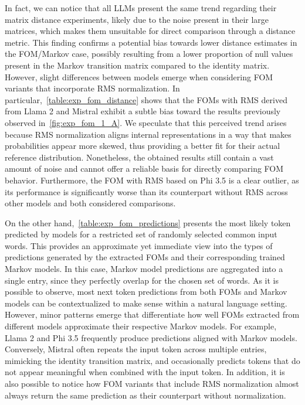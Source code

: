 In fact, we can notice that all LLMs present the same trend regarding their matrix distance experiments, likely due to the noise present in their large matrices, which makes them unsuitable for direct comparison through a distance metric.
This finding confirms a potential bias towards lower distance estimates in the FOM/Markov case, possibly resulting from a lower proportion of null values present in the Markov transition matrix compared to the identity matrix.
However, slight differences between models emerge when considering FOM variants that incorporate RMS normalization.
In particular,~\cref{table:exp_fom_distance} shows that the FOMs with RMS derived from Llama 2 and Mistral exhibit a subtle bias toward the results previously observed in~\cref{fig:exp_fom_1_A}.
We speculate that this perceived trend arises because RMS normalization aligns internal representations in a way that makes probabilities appear more skewed, thus providing a better fit for their actual reference distribution.
Nonetheless, the obtained results still contain a vast amount of noise and cannot offer a reliable basis for directly comparing FOM behavior.
Furthermore, the FOM with RMS based on Phi 3.5 is a clear outlier, as its performance is significantly worse than its counterpart without RMS across other models and both considered comparisons.

On the other hand,~\cref{table:exp_fom_predictions} presents the most likely token predicted by models for a restricted set of randomly selected common input words.
This provides an approximate yet immediate view into the types of predictions generated by the extracted FOMs and their corresponding trained Markov models.
In this case, Markov model predictions are aggregated into a single entry, since they perfectly overlap for the chosen set of words.
As it is possible to observe, most next token predictions from both FOMs and Markov models can be contextualized to make sense within a natural language setting.
However, minor patterns emerge that differentiate how well FOMs extracted from different models approximate their respective Markov models.
For example, Llama 2 and Phi 3.5 frequently produce predictions aligned with Markov models.
Conversely, Mistral often repeats the input token across multiple entries, mimicking the identity transition matrix, and occasionally predicts tokens that do not appear meaningful when combined with the input token.
In addition, it is also possible to notice how FOM variants that include RMS normalization almost always return the same prediction as their counterpart without normalization.

